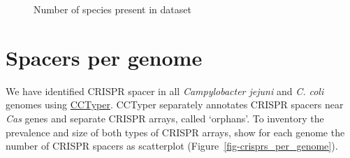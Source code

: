 \documentclass[
  twocolumn,
  landscape]{report}
\begin{document}
\begin{figure}[H]


\caption{\label{fig-number_of_species}Number of species present in
dataset}

\end{figure}%

\chapter{Spacers per genome}\label{spacers-per-genome}

We have identified CRISPR spacer in all \emph{Campylobacter jejuni} and
\emph{C. coli} genomes using
\href{https://github.com/Russel88/CRISPRCasTyper}{CCTyper}. CCTyper
separately annotates CRISPR spacers near \emph{Cas} genes and separate
CRISPR arrays, called `orphans'. To inventory the prevalence and size of
both types of CRISPR arrays, show for each genome the number of CRISPR
spacers as scatterplot (Figure~\ref{fig-crisprs_per_genome}).
\end{document}
